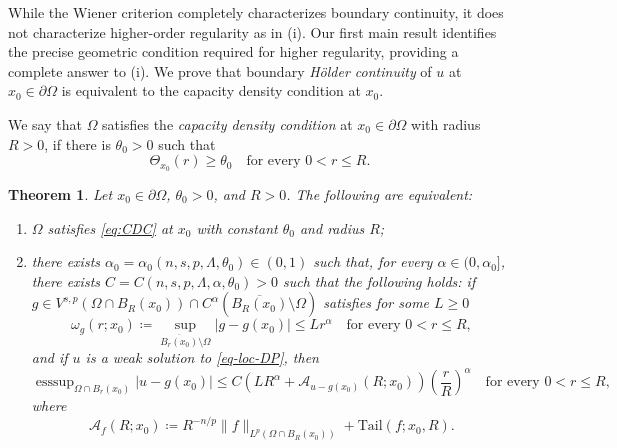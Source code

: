 \documentclass[11pt]{amsart}
\theoremstyle{plain}
\newtheorem{theorem}{Theorem}[section]
\theoremstyle{definition}
\numberwithin{equation}{section}
\DeclareMathOperator*{\esssup}{esssup}
\begin{document}
While the Wiener criterion completely characterizes boundary continuity, it does not characterize higher-order regularity as in (i). Our first main result identifies the precise geometric condition required for higher regularity, providing a complete answer to (i). We prove that boundary \emph{H\"older continuity} of $u$ at $x_0 \in \partial \Omega$ is equivalent to the capacity density condition at $x_0$.

We say that $\Omega$ satisfies the \emph{capacity density condition} at $x_0 \in \partial \Omega$ with radius $R > 0$, if there is $\theta_0 > 0$ such that
\begin{equation}
\label{eq:CDC}\tag{CDC}
\Theta_{x_0}(r) \ge \theta_0\quad\text{for every }0<r \leq R.
\end{equation}

\begin{theorem}\label{thm-CDC}
Let $x_0 \in \partial\Omega$, $\theta_0>0$, and $R>0$. The following are equivalent:
\begin{enumerate}
\item\label{eq-CDC-a}
$\Omega$ satisfies \eqref{eq:CDC} at $x_0$ with constant $\theta_0$ and radius $R$;
\item\label{eq-CDC-b}
there exists $\alpha_0 = \alpha_0(n, s, p, \Lambda, \theta_0) \in (0, 1)$ such that, for every $\alpha \in (0, \alpha_0]$, there exists $C=C(n, s, p, \Lambda, \alpha, \theta_0)>0$ such that the following holds: if $g \in V^{s, p}(\Omega \cap B_R(x_0)) \cap C^\alpha(\overline{B_R(x_0)} \setminus \Omega)$ satisfies for some $L \geq 0$
\begin{equation}\label{eq-g-holder}
\omega_g(r; x_0)  \coloneqq \sup_{\overline{B_r(x_0)} \setminus \Omega}|g-g(x_0)| \leq Lr^\alpha \quad\text{for every }0<r \leq R,
\end{equation}
and if $u$ is a weak solution to \eqref{eq-loc-DP}, then
\begin{equation*}
\esssup_{\Omega\cap B_r(x_0)} |u-g(x_0)| \leq C\left(LR^{\alpha}+\mathcal{A}_{u-g(x_0)}(R; x_0)  \right) \left( \frac{r}{R} \right)^\alpha \quad\text{for every }0<r \leq R,
\end{equation*}
where
\begin{equation}\label{eq-A}
    \mathcal{A}_f(R; x_0) \coloneqq R^{-n/p} \|f\|_{L^p(\Omega \cap B_R(x_0))} + \mathrm{Tail}(f; x_0, R).
\end{equation}
\end{enumerate}
\end{theorem}
\end{document}
